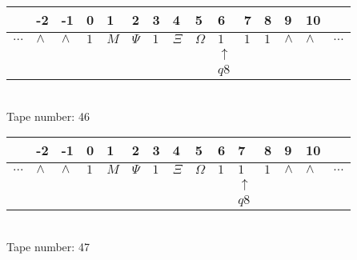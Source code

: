 \documentclass{article}
\begin{document}
\begin{table}[H]
\centering
\begin{tabular}{lllllllllllllll}
 & -2 & -1 & 0 & 1 & 2 & 3 & 4 & 5 & 6 & 7 & 8 & 9 & 10 & \\
\hline
$...$ & \multicolumn{1}{|l|}{$\wedge$} & \multicolumn{1}{|l|}{$\wedge$} & \multicolumn{1}{|l|}{$1$} & \multicolumn{1}{|l|}{$M$} & \multicolumn{1}{|l|}{$\Psi$} & \multicolumn{1}{|l|}{$1$} & \multicolumn{1}{|l|}{$\Xi$} & \multicolumn{1}{|l|}{$\Omega$} & \multicolumn{1}{|l|}{$1$} & \multicolumn{1}{|l|}{$1$} & \multicolumn{1}{|l|}{$1$} & \multicolumn{1}{|l|}{$\wedge$} & \multicolumn{1}{|l|}{$\wedge$} & $...$\\
\hline
&  &  &  &  &  &  &  &  & $\uparrow$ &  &  &  &  &  \\
&  &  &  &  &  &  &  &  & $ q8 $ &  &  &  &  &  \\
\end{tabular}
\\
Tape number: 46
\noindent\makebox[\linewidth]{\hdashrule{\textwidth}{1pt}{1pt}}\end{table}

\begin{table}[H]
\centering
\begin{tabular}{lllllllllllllll}
 & -2 & -1 & 0 & 1 & 2 & 3 & 4 & 5 & 6 & 7 & 8 & 9 & 10 & \\
\hline
$...$ & \multicolumn{1}{|l|}{$\wedge$} & \multicolumn{1}{|l|}{$\wedge$} & \multicolumn{1}{|l|}{$1$} & \multicolumn{1}{|l|}{$M$} & \multicolumn{1}{|l|}{$\Psi$} & \multicolumn{1}{|l|}{$1$} & \multicolumn{1}{|l|}{$\Xi$} & \multicolumn{1}{|l|}{$\Omega$} & \multicolumn{1}{|l|}{$1$} & \multicolumn{1}{|l|}{$1$} & \multicolumn{1}{|l|}{$1$} & \multicolumn{1}{|l|}{$\wedge$} & \multicolumn{1}{|l|}{$\wedge$} & $...$\\
\hline
&  &  &  &  &  &  &  &  &  & $\uparrow$ &  &  &  &  \\
&  &  &  &  &  &  &  &  &  & $ q8 $ &  &  &  &  \\
\end{tabular}
\\
Tape number: 47
\noindent\makebox[\linewidth]{\hdashrule{\textwidth}{1pt}{1pt}}\end{table}
\end{document}
